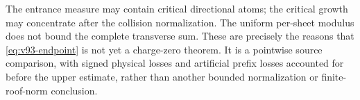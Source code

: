 The entrance measure may contain critical directional atoms; the
critical growth may concentrate after the collision normalization.
The uniform per-sheet modulus does not bound the complete transverse
sum. These are precisely the reasons that
\eqref{eq:v93-endpoint} is not yet a charge-zero theorem. It is a
pointwise source comparison, with signed physical losses and artificial
prefix losses accounted for before the upper estimate, rather than
another bounded normalization or finite-roof-norm conclusion.
